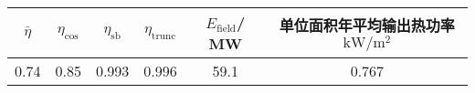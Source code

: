 \begin{tabular}{|cccccc|}
\hline
\(\bar \eta\) & \(\eta _{\cos}\) & \(\eta _{\mathrm{s b}}\) & \(\eta _{\mathrm{trunc}}\) & \(E_{\mathrm{field}}\)/ MW &单位面积年平均输出热功率 \(\mathrm{kW}/\mathrm{m}^{2}\)\\
\hline
0.74 & 0.85 & 0.993 & 0.996 & 59.1 & 0.767\\
\hline
\end{tabular}
